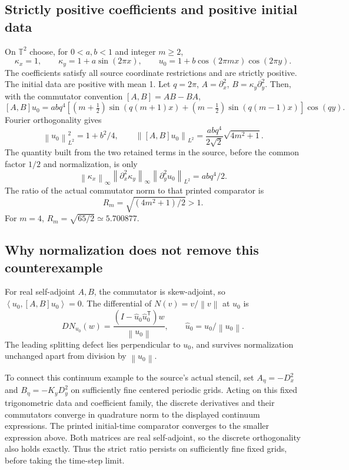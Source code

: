 \documentclass[11pt]{article}
\newcommand{\norm}[1]{\left\lVert #1\right\rVert}
\newcommand{\ip}[2]{\left\langle #1,#2\right\rangle}
\newcommand{\T}{\mathbb T}
\begin{document}
\subsection{Strictly positive coefficients and positive initial data}
On $\T^2$ choose, for $0<a,b<1$ and integer $m\geq2$,
\[
 \kappa_x=1,\qquad \kappa_y=1+a\sin(2\pi x),\qquad
 u_0=1+b\cos(2\pi m x)\cos(2\pi y).
\]
The coefficients satisfy all source coordinate restrictions and are
strictly positive. The initial data are positive with mean 1.
Let $q=2\pi$, $A=\partial_x^2$, $B=\kappa_y\partial_y^2$.
Then, with the commutator convention $[A,B]=AB-BA$,
\[
 [A,B]u_0=abq^4
 \left[(m+\tfrac12)\sin(q(m+1)x)
 +(m-\tfrac12)\sin(q(m-1)x)\right]\cos(qy).
\]
Fourier orthogonality gives
\[
 \norm{u_0}_{L^2}^2=1+b^2/4,\qquad
 \norm{[A,B]u_0}_{L^2}
 =\frac{abq^4}{2\sqrt2}\sqrt{4m^2+1}.
\]
The quantity built from the two retained terms in the source, before
the common factor $1/2$ and normalization, is only
\[
 \norm{\kappa_x}_\infty
 \norm{\partial_x^2\kappa_y}_\infty
 \norm{\partial_y^2u_0}_{L^2}
 =abq^4/2 .
\]
The ratio of the actual commutator norm to that printed comparator is
\[
 R_m=\sqrt{(4m^2+1)/2}>1 .
\]
For $m=4$, $R_m=\sqrt{65/2}\simeq5.700877$.

\subsection{Why normalization does not remove this counterexample}
For real self-adjoint $A,B$, the commutator is skew-adjoint, so
$\ip{u_0}{[A,B]u_0}=0$. The differential of $N(v)=v/\norm v$ at $u_0$
is
\[
 DN_{u_0}(w)=
 \frac{(I-\hat u_0\hat u_0^{\mathsf T})w}{\norm{u_0}},
 \qquad \hat u_0=u_0/\norm{u_0}.
\]
The leading splitting defect lies perpendicular to $u_0$, and survives
normalization unchanged apart from division by $\norm{u_0}$.

To connect this continuum example to the source's actual stencil, set
$A_\eta=-D_x^2$ and $B_\eta=-K_yD_y^2$ on sufficiently fine centered
periodic grids. Acting on this fixed trigonometric data and coefficient
family, the discrete derivatives and their commutators converge in
quadrature norm to the displayed continuum expressions. The printed
initial-time comparator converges to the smaller expression above.
Both matrices are real self-adjoint, so the discrete orthogonality also
holds exactly. Thus the strict ratio persists on sufficiently fine
fixed grids, before taking the time-step limit.
\end{document}

